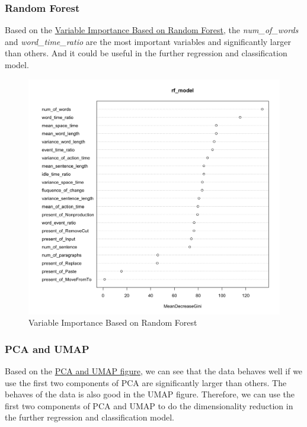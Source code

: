 \documentclass[8pt]{article}
\begin{document}
\subsubsection{Random Forest}
Based on the \hyperref[fig:RF_important]{Variable Importance Based on Random Forest}, the \textit{num\_of\_words} and \textit{word\_time\_ratio} are the most important variables and significantly larger than others. 
And it could be useful in the further regression and classification model. 
\begin{figure}[H]
    \centering
    \label{fig:RF_important}
    \includegraphics*[scale=0.1]{figures/Variable_improtance_RF.png}
    \caption{Variable Importance Based on Random Forest}
\end{figure}

\subsubsection{PCA and UMAP}
Based on the \hyperref[fig:PCA_and_UMAP]{PCA and UMAP figure}, we can see that the data behaves well if we use the first two components of PCA are significantly larger than others. The behaves of the data is also good in the UMAP figure. Therefore, we can use the first two components of PCA and UMAP to do the dimensionality reduction in the further regression and classification model.
\end{document}
